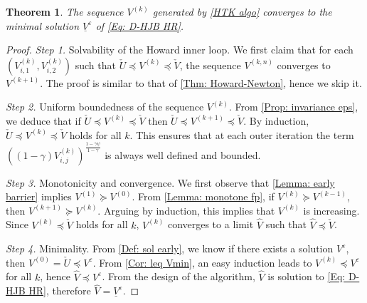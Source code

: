 \documentclass[11pt]{article}
\numberwithin{equation}{section}
\numberwithin{algorithm}{section}
\newtheorem{theorem}{Theorem}[section]
\newcommand{\lc}{\left(}
\newcommand{\rc}{\right)}
\newcommand{\eps}{\varepsilon}
\newcommand{\eeq}{\end{equation}}
\newcommand{\g}{\gamma}
\newcommand{\p}{\psi}
\theoremstyle{plain}
\begin{document}
\begin{algorithm}[!h]
\end{algorithm}

\begin{theorem}\label{Thm: Tarski convergence}
The sequence $V^{(k)}$ generated by \cref{HTK algo} converges to the minimal solution $\underline{V}^{\eps}$ of \cref{Eq: D-HJB HR}. 
\end{theorem}
\begin{proof}
{\it{Step 1.}} Solvability of the Howard inner loop. We first claim that for each $\left(V^{(k)}_{i,1},V^{(k)}_{i,2}\right)$ such that $\check{U}\preceq V^{(k)}\preceq\check{V}$, the sequence $V^{(k,n)}$ converges to $V^{(k+1)}$. The proof is similar to that of \cref{Thm: Howard-Newton}, hence we skip it.\par
{\it{Step 2.}} Uniform boundedness of the sequence $V^{(k)}$. From \cref{Prop: invariance eps}, we deduce that if $\check{U}\preceq V^{(k)}\preceq \check{V}$ then $\check{U}\preceq V^{(k+1)}\preceq \check{V}$. By induction, $\check{U}\preceq V^{(k)}\preceq \check{V}$ holds for all $k$. This ensures that at each outer iteration the term $\lc(1-\g){V}^{(k)}_{i,j}\rc^{\frac{1-\g \p}{1-\g}}$ is always well defined and bounded. \par 
{\it{Step 3.}} Monotonicity and convergence. We first observe that \cref{Lemma: early barrier} implies $V^{(1)}\succeq V^{(0)}$. From \cref{Lemma: monotone fp}, if $V^{(k)}\succeq V^{(k-1)}$, then $V^{(k+1)}\succeq V^{(k)}$. Arguing by induction, this implies that $V^{(k)}$ is increasing. Since $V^{(k)}\preceq \check{V}$ holds for all $k$, $V^{(k)}$ converges to a limit $\widehat{V}$ such that $\widehat{V}\preceq \check{V}$. \par
{\it{Step 4.}} Minimality. From \cref{Def: sol early}, we know if there exists a solution $V^{\eps}$, then ${V}^{(0)}=\check{U}\preceq V^{\eps}$. From \cref{Cor: leq Vmin}, an easy induction leads to ${V}^{(k)}\preceq V^{\eps}$ for all $k$, hence $\widehat{V}\preceq V^{\eps}$. From the design of the algorithm, $\widehat{V}$ is solution to \cref{Eq: D-HJB HR}, therefore $\widehat{V}=\underline{V}^{\eps}$. 
\end{proof}
\end{document}
